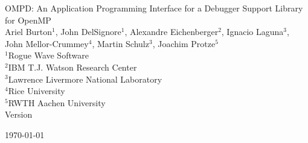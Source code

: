 \documentclass[titlepage]{article}
\begin{document}
 
\pagestyle{plain}

\begin{titlepage}
\vspace*{\fill}
\begin{center}
  	{\LARGE OMPD: An Application Programming Interface for a Debugger 
  	Support Library for OpenMP}\\[1cm]

  	{\large
  	Ariel Burton$^{1}$,
  	John DelSignore$^{1}$,
  	Alexandre Eichenberger$^{2}$,
  	Ignacio Laguna$^{3}$, \\
  	John Mellor-Crummey$^{4}$,
  	Martin Schulz$^{3}$,
  	Joachim Protze$^{5}$
  	}\\[0.5cm]

    {\large $^{1}$Rogue Wave Software}\\[0.1cm]
    {\large $^{2}$IBM T.J. Watson Research Center}\\[0.1cm]
    {\large $^{3}$Lawrence Livermore National Laboratory}\\[0.1cm]
    {\large $^{4}$Rice University}\\[0.1cm]
    {\large $^{5}$RWTH Aachen University}\\[1cm]
    
    {\large Version }\\[1cm]
    
  	{\large \today\par}
\end{center}
\vspace*{\fill}
\end{titlepage}
\clearpage
\setcounter{page}{2}                                

\tableofcontents
\clearpage


\clearpage
{}


















\clearpage


 
\end{document}
